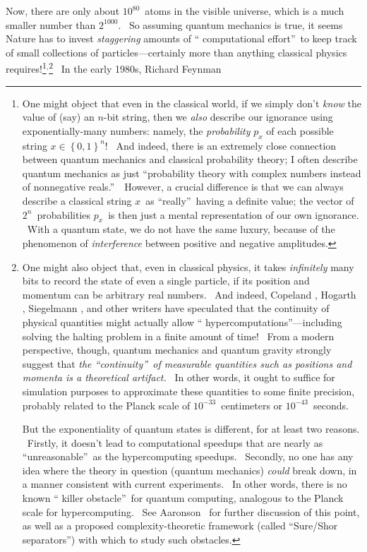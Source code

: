 \documentclass[12pt,onecolumn]{article}%
\begin{document}
Now, there are only about $10^{80}$\ atoms in the visible universe, which is a
much smaller number than $2^{1000}$. \ So assuming quantum mechanics is true,
it seems Nature has to invest \textit{staggering} amounts of \textquotedblleft
computational effort\textquotedblright\ to keep track of small collections of
particles---certainly more than anything classical physics
requires!\footnote{One might object that even in the classical world, if we
simply don't \textit{know} the value of (say) an $n$-bit string, then we
\textit{also} describe our ignorance using exponentially-many numbers: namely,
the \textit{probability} $p_{x}$ of each possible string $x\in\left\{
0,1\right\}  ^{n}$! \ And indeed, there is an extremely close connection
between quantum mechanics and classical probability theory; I often describe
quantum mechanics as just \textquotedblleft probability theory with complex
numbers instead of nonnegative reals.\textquotedblright\ \ However, a crucial
difference is that we can always describe a classical string $x$\ as
\textquotedblleft really\textquotedblright\ having a definite value; the
vector of $2^{n}$\ probabilities $p_{x}$\ is then just a mental representation
of our own ignorance. \ With a quantum state, we do not have the same luxury,
because of the phenomenon of \textit{interference} between positive and
negative amplitudes.}$^{,}$\footnote{One might also object that, even in
classical physics, it takes \textit{infinitely} many bits to record the state
of even a single particle, if its position and momentum can be arbitrary real
numbers. \ And indeed, Copeland \cite{copeland}, Hogarth \cite{hogarth},
Siegelmann \cite{siegelmann}, and other writers have speculated that the
continuity of physical quantities might actually allow \textquotedblleft
hypercomputations\textquotedblright---including solving the halting problem in
a finite amount of time! \ From a modern perspective, though, quantum
mechanics and quantum gravity strongly suggest that \textit{the
\textquotedblleft continuity\textquotedblright\ of measurable quantities such
as positions and momenta is a theoretical artifact.} \ In other words, it
ought to suffice for simulation purposes to approximate these quantities to
some finite precision, probably related to the Planck scale of $10^{-33}%
$\ centimeters or $10^{-43}$\ seconds.
\par
But the exponentiality of quantum states is different, for at least two
reasons. \ Firstly, it doesn't lead to computational speedups that are nearly
as \textquotedblleft unreasonable\textquotedblright\ as the hypercomputing
speedups. \ Secondly, no one has any idea where the theory in question
(quantum mechanics) \textit{could} break down, in a manner consistent with
current experiments. \ In other words, there is no known \textquotedblleft
killer obstacle\textquotedblright\ for quantum computing, analogous to the
Planck scale for hypercomputing. \ See Aaronson \cite{aar:mlin}\ for further
discussion of this point, as well as a proposed complexity-theoretic framework
(called \textquotedblleft Sure/Shor separators\textquotedblright) with which
to study such obstacles.} \ In the early 1980s, Richard Feynman
\end{document}
